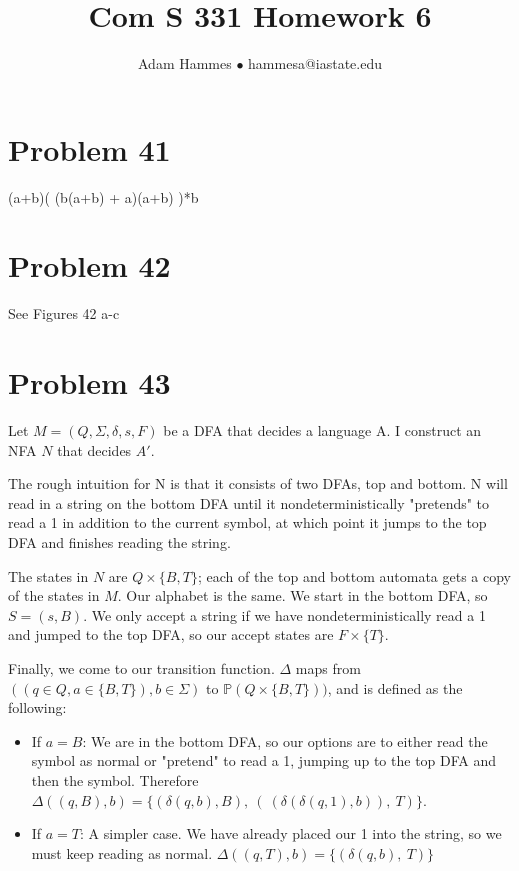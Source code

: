 \documentclass[11pt]{article}
\begin{document}
\title{Com S 331 Homework 6}
\author{Adam Hammes $\bullet$ hammesa@iastate.edu}
\maketitle

\section*{Problem 41}

(a+b)( (b(a+b) + a)(a+b) )*b

\section*{Problem 42}

See Figures 42 a-c

\section*{Problem 43}

Let $M = (Q,\Sigma,\delta,s,F)$ be a DFA that decides a language A. I construct an NFA $N$ that decides $A'$.

The rough intuition for N is that it consists of two DFAs, top and bottom. N will read in a string on the bottom DFA until it nondeterministically "pretends" to read a 1 in addition to the current symbol, at which point it jumps to the top DFA and finishes reading the string.

The states in $N$ are $Q \times \{B,T\}$; each of the top and bottom automata gets a copy of the states in $M$. Our alphabet is the same. We start in the bottom DFA, so $S = (s,B)$. We only accept a string if we have nondeterministically read a 1 and jumped to the top DFA, so our accept states are $F \times \{T\}$.

Finally, we come to our transition function. $\Delta$ maps from $((q \in Q, a \in \{B,T\}) , b \in \Sigma)$ to $ \mathbb{P}(Q \times \{B,T\}))$, and is defined as the following:

\begin{itemize}
	\item If $a = B$: We are in the bottom DFA, so our options are to either read the symbol as normal or "pretend" to read a 1, jumping up to the top DFA and then the symbol. Therefore $\Delta((q, B), b) = \{ (\delta(q, b), B),\ (\ (\delta( \delta( q, 1), b)),\  T) \}$.
	
	\item If $a = T$: A simpler case. We have already placed our 1 into the string, so we must keep reading as normal. $\Delta((q, T), b) = \{ (\delta(q, b),\ T) \}$
\end{itemize}
\end{document}
